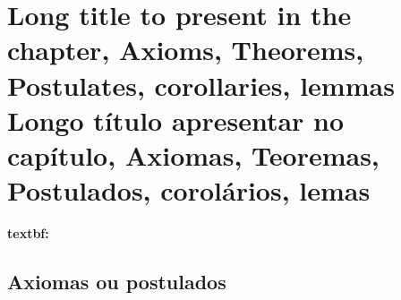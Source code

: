 

\chapter[\lang{Abbreviation for the Table of Contents}
{Abreviação para o Sumário}]
{
    \lang
    {Long title to present in the chapter, Axioms, Theorems, Postulates,
     corollaries, lemmas}
    {Longo título apresentar no capítulo, Axiomas, Teoremas, Postulados,
     corolários, lemas}
}

\label{cap_exemplos}

\begin{flushright}
    \englishword{\showfont}
\end{flushright}

\sloppy
\textbf{textbf: \englishword{\showfont}}
\fussy

\section{Axiomas ou postulados}

